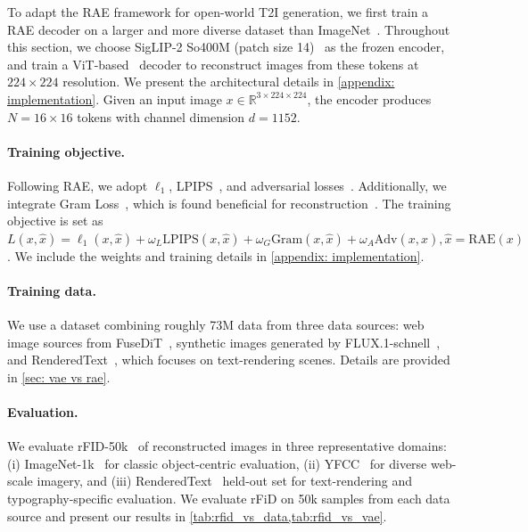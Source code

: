 \documentclass[10pt,twocolumn,letterpaper]{article}
\begin{document}
To adapt the RAE framework for open-world T2I generation, we first train a RAE decoder on a larger and more diverse dataset than ImageNet~\citep{deng2009imagenet}.
Throughout this section, we choose SigLIP-2 So400M (patch size 14)~\citep{tschannen2025siglip} as the frozen encoder, and train a ViT-based~\citep{dosovitskiy2020image} decoder to reconstruct images from these tokens at $224\times224$ resolution. We present the architectural details in \cref{appendix: implementation}. 
Given an input image $x \in \mathbb{R}^{3\times224\times224}$, the encoder produces $N = 16 \times 16$ tokens with channel dimension $d = 1152$.


\paragraph{Training objective.}
Following RAE, we adopt $\ell_1$, LPIPS~\citep{lpips}, and adversarial losses~\citep{styleganxl, GAN}. Additionally, we integrate Gram Loss~\citep{gramloss}, which is found beneficial for reconstruction~\citep{atoken}. The training objective is set as $
L(x, \hat{x}) = \ell_1(x, \hat{x}) + \omega_L \text{LPIPS}(x, \hat{x}) + \omega_G \text{Gram}(x, \hat{x}) +  \omega_A \text{Adv}(x,\hat{x}), \hat{x} = \text{RAE}(x)$. We include the weights and training details in \cref{appendix: implementation}.


\paragraph{Training data.}
We use a dataset combining roughly 73M data from three data sources: web image sources from FuseDiT~\citep{Tang_2025_CVPR}, synthetic images generated by FLUX.1-schnell~\citep{flux}, and RenderedText~\citep{wendlerc2024renderedtext}, which focuses on text-rendering scenes.
Details are provided in \cref{sec: vae vs rae}.


\paragraph{Evaluation.}
We evaluate rFID-50k~\citep{fid} of reconstructed images in three representative domains: 
(i) ImageNet-1k~\citep{imagenet} for classic object-centric evaluation, 
(ii) YFCC~\citep{thomee2016yfcc100m} for diverse web-scale imagery, 
and (iii) RenderedText~\citep{wendlerc2024renderedtext} held-out set for text-rendering and typography-specific evaluation. We evaluate rFiD on 50k samples from each data source and present our results in \cref{tab:rfid_vs_data,tab:rfid_vs_vae}.
\end{document}
